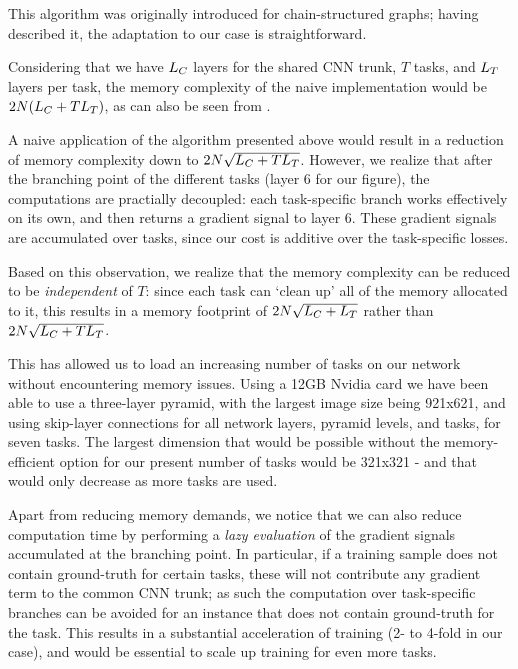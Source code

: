 \documentclass[10pt,twocolumn,letterpaper]{article}
\begin{document}
 
 This algorithm was originally introduced for chain-structured graphs; having described it, the adaptation to our case is straightforward. 

Considering that we have  $L_{C}$ layers for the shared CNN trunk, $T$ tasks,  and $L_{T}$ layers per task, the memory complexity of the naive implementation would be $2 N (L_{C}   +  T L_{T} )$, as can also be seen from .

A naive application of the algorithm presented above would result in a reduction of memory complexity down to $2 N \sqrt{L_{C}   +  T L_{T} }$.
However, we realize that after the branching point of the different tasks (layer 6 for our figure), the computations are practially decoupled: each task-specific branch works effectively on its own, and then returns a gradient signal to layer 6. These gradient signals are accumulated over tasks, since our cost is additive over the task-specific losses. 

Based on this observation, we realize that the memory complexity can be reduced to be {\emph{independent}} of $T$: since each task can `clean up' all of the memory allocated to it, this results in a memory footprint of $2 N \sqrt{L_{C}   +  L_{T}}$ rather than  $2 N \sqrt{L_{C}   +  TL_{T}}$.

This has allowed us to load an increasing number of tasks on our network without encountering memory issues. Using a 12GB Nvidia card we have been able to use a three-layer pyramid, with the largest image size being 921x621, and using skip-layer connections for all network layers, pyramid levels, and tasks, for seven tasks. The largest dimension that would be possible without the memory-efficient option for our present number of tasks  would be 321x321 - and that would only decrease as more tasks are used.

Apart from reducing memory demands, we notice that we can also reduce computation time by performing a {\emph{lazy evaluation}} of the gradient signals accumulated at the branching point. In particular, if a training sample does not contain ground-truth for certain tasks, these will not contribute any gradient term to the common CNN trunk; as such the computation over task-specific branches can be avoided for an instance that does not contain ground-truth for the task. This results in a substantial acceleration of training (2- to 4-fold in our case), and would be essential to scale up training for even more tasks. 
\end{document}
